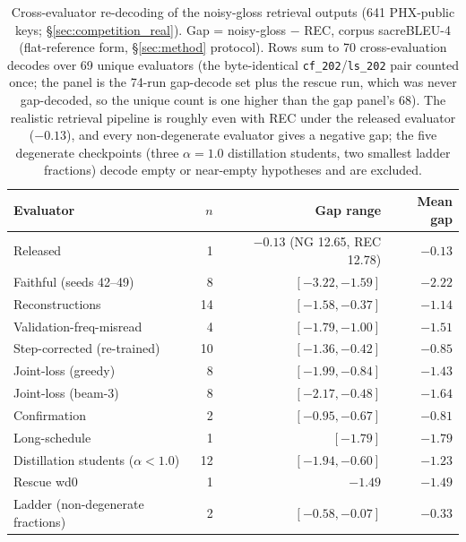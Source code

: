 \documentclass[pdflatex,sn-chicago]{sn-jnl}
\begin{document}
\begin{table}[h]
\centering
\scriptsize\setlength{\tabcolsep}{3pt}
\caption{Cross-evaluator re-decoding of the noisy-gloss retrieval outputs (641 PHX-public keys; \S\ref{sec:competition_real}). Gap = noisy-gloss $-$ REC, corpus sacreBLEU-4 (flat-reference form, \S\ref{sec:method} protocol). Rows sum to 70 cross-evaluation decodes over 69 unique evaluators (the byte-identical \texttt{cf\_202}/\texttt{ls\_202} pair counted once; the panel is the 74-run gap-decode set plus the rescue run, which was never gap-decoded, so the unique count is one higher than the gap panel's 68). The realistic retrieval pipeline is roughly even with REC under the released evaluator ($-0.13$), and every non-degenerate evaluator gives a negative gap; the five degenerate checkpoints (three $\alpha{=}1.0$ distillation students, two smallest ladder fractions) decode empty or near-empty hypotheses and are excluded.}
\label{tab:s11_noisy_gloss_cross_eval}
\begin{tabular}{lrrr}
\toprule
Evaluator & $n$ & Gap range & Mean gap \\
\midrule
Released & 1 & $-0.13$ (NG 12.65, REC 12.78) & $-0.13$ \\
Faithful (seeds 42--49) & 8 & $[-3.22, -1.59]$ & $-2.22$ \\
Reconstructions & 14 & $[-1.58, -0.37]$ & $-1.14$ \\
Validation-freq-misread & 4 & $[-1.79, -1.00]$ & $-1.51$ \\
Step-corrected (re-trained) & 10 & $[-1.36, -0.42]$ & $-0.85$ \\
Joint-loss (greedy) & 8 & $[-1.99, -0.84]$ & $-1.43$ \\
Joint-loss (beam-3) & 8 & $[-2.17, -0.48]$ & $-1.64$ \\
Confirmation & 2 & $[-0.95, -0.67]$ & $-0.81$ \\
Long-schedule & 1 & $[-1.79]$ & $-1.79$ \\
Distillation students ($\alpha{<}1.0$) & 12 & $[-1.94, -0.60]$ & $-1.23$ \\
Rescue wd0 & 1 & $-1.49$ & $-1.49$ \\
Ladder (non-degenerate fractions) & 2 & $[-0.58, -0.07]$ & $-0.33$ \\
\bottomrule
\end{tabular}
\end{table}
\end{document}
